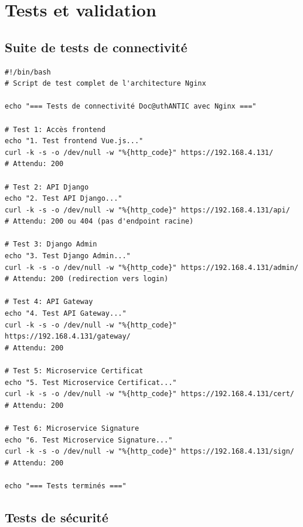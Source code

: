 \documentclass[12pt,a4paper]{article}
\begin{document}

\section{Tests et validation}

\subsection{Suite de tests de connectivité}

\begin{lstlisting}[style=bash, caption={Tests de connectivité complets}]
#!/bin/bash
# Script de test complet de l'architecture Nginx

echo "=== Tests de connectivité Doc@uthANTIC avec Nginx ==="

# Test 1: Accès frontend
echo "1. Test frontend Vue.js..."
curl -k -s -o /dev/null -w "%{http_code}" https://192.168.4.131/
# Attendu: 200

# Test 2: API Django
echo "2. Test API Django..."
curl -k -s -o /dev/null -w "%{http_code}" https://192.168.4.131/api/
# Attendu: 200 ou 404 (pas d'endpoint racine)

# Test 3: Django Admin
echo "3. Test Django Admin..."
curl -k -s -o /dev/null -w "%{http_code}" https://192.168.4.131/admin/
# Attendu: 200 (redirection vers login)

# Test 4: API Gateway
echo "4. Test API Gateway..."
curl -k -s -o /dev/null -w "%{http_code}" https://192.168.4.131/gateway/
# Attendu: 200

# Test 5: Microservice Certificat
echo "5. Test Microservice Certificat..."
curl -k -s -o /dev/null -w "%{http_code}" https://192.168.4.131/cert/
# Attendu: 200

# Test 6: Microservice Signature
echo "6. Test Microservice Signature..."
curl -k -s -o /dev/null -w "%{http_code}" https://192.168.4.131/sign/
# Attendu: 200

echo "=== Tests terminés ==="
\end{lstlisting}

\subsection{Tests de sécurité}
\end{document}
